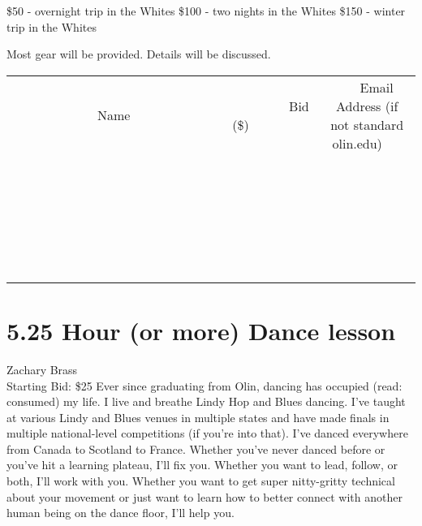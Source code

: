 \documentclass[11pt]{article}
\begin{document}
\$50 - overnight trip in the Whites
\$100 - two nights in the Whites
\$150 - winter trip in the Whites

Most gear will be provided. Details will be discussed.
\\[6ex]
\begin{tabular}{c c c}
~~~~~~~~~~~~~Name~~~~~~~~~~~~~ & ~~~~~~~~~Bid (\$)~~~~~~~~~  & ~~~Email Address (if not standard olin.edu)~~~\\
 & & \\
\hline
 & & \\
\hline
 & & \\
\hline
 & & \\
\hline
 & & \\
\hline
 & & \\
\hline
 & & \\
\hline
 & & \\
\hline
 & & \\
\hline
 & & \\
\hline
 & & \\
\hline
 & & \\
\hline
 & & \\
\hline
 & & \\
\hline
 & & \\
\hline
 & & \\
\hline
 & & \\
\hline
 & & \\
\hline
 & & \\
\hline
 & & \\
\hline
 & & \\
\hline
 & & \\
\hline
 & & \\
\hline
 & & \\
\hline
 & & \\
\hline
 & & \\
\hline
\end{tabular}
\newpage
\section*{5.25 Hour (or more) Dance lesson}
Zachary Brass
\\
Starting Bid: \$25
\newline
Ever since graduating from Olin, dancing has occupied (read: consumed) my life. I live and breathe Lindy Hop and Blues dancing. I've taught at various Lindy and Blues venues in multiple states and have made finals in multiple national-level competitions (if you're into that). I've danced everywhere from Canada to Scotland to France. Whether you've never danced before or you've hit a learning plateau, I'll fix you. Whether you want to lead, follow, or both, I'll work with you. Whether you want to get super nitty-gritty technical about your movement or just want to learn how to better connect with another human being on the dance floor, I'll help you.
\end{document}
